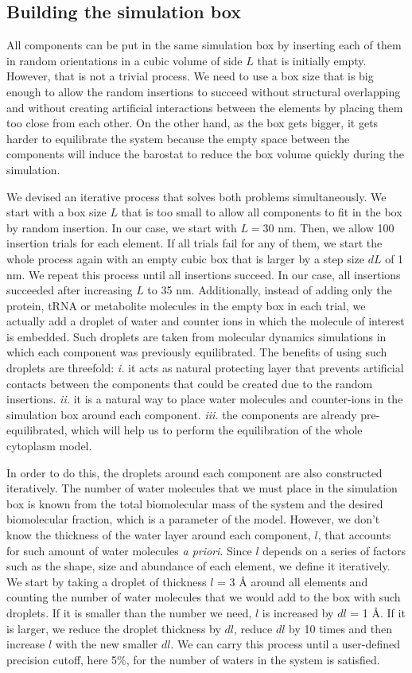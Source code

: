 \documentclass[journal=jcisd8,manuscript=article]{achemso}
\begin{document}
\subsection{Building the simulation box}
All components can be put in the same simulation box by inserting each
of them in random orientations in a cubic volume of side $L$ that is
initially empty. However, that is not a trivial process. We need to
use a box size that is big enough to allow the random insertions to
succeed without structural overlapping and without creating artificial
interactions between the elements by placing them too close from each
other. On the other hand, as the box gets bigger, it gets harder to
equilibrate the system because the empty space between the components
will induce the barostat to reduce the box volume quickly during the
simulation.

We devised an iterative process that solves both problems
simultaneously. We start with a box size $L$ that is too small to
allow all components to fit in the box by random insertion. In our
case, we start with $L = 30$ nm. Then, we allow 100 insertion trials
for each element. If all trials fail for any of them, we start the
whole process again with an empty cubic box that is larger by a step
size $dL$ of 1 nm. We repeat this process until all insertions
succeed. In our case, all insertions succeeded after increasing $L$ to
35 nm. Additionally, instead of adding only the protein, tRNA or
metabolite molecules in the empty box in each trial, we actually add a
droplet of water and counter ions in which the molecule of interest is
embedded. Such droplets are taken from molecular dynamics simulations
in which each component was previously equilibrated. The benefits of
using such droplets are threefold: \textit{i.} it acts as natural
protecting layer that prevents artificial contacts between the
components that could be created due to the random
insertions. \textit{ii.} it is a natural way to place water molecules
and counter-ions in the simulation box around each
component. \textit{iii.} the components are already pre-equilibrated,
which will help us to perform the equilibration of the whole cytoplasm
model.

In order to do this, the droplets around each component are also
constructed iteratively. The number of water molecules that we must
place in the simulation box is known from the total biomolecular mass
of the system and the desired biomolecular fraction, which is a
parameter of the model. However, we don't know the thickness of the
water layer around each component, $l$, that accounts for such amount
of water molecules \textit{a priori}. Since $l$ depends on a series of
factors such as the shape, size and abundance of each element, we
define it iteratively. We start by taking a droplet of thickness $l$ =
3 \r{A} around all elements and counting the number of water molecules
that we would add to the box with such droplets. If it is smaller than
the number we need, $l$ is increased by $dl$ = 1 \r{A}. If it is
larger, we reduce the droplet thickness by $dl$, reduce $dl$ by 10
times and then increase $l$ with the new smaller $dl$. We can carry
this process until a user-defined precision cutoff, here 5\%, for the
number of waters in the system is satisfied.
\end{document}
